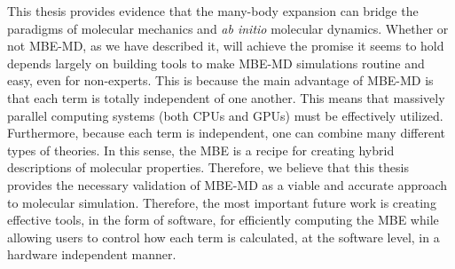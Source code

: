 \documentclass[11pt, proquest]{uwthesis}[2020/02/24]
\begin{document}
\par This thesis provides evidence that the many-body expansion can bridge the paradigms of molecular mechanics and \textit{ab initio} molecular dynamics. Whether or not MBE-MD, as we have described it, will achieve the promise it seems to hold depends largely on building tools to make MBE-MD simulations routine and easy, even for non-experts. This is because the main advantage of MBE-MD is that each term is totally independent of one another. This means that massively parallel computing systems (both CPUs and GPUs) must be effectively utilized. Furthermore, because each term is independent, one can combine many different types of theories. In this sense, the MBE is a recipe for creating hybrid descriptions of molecular properties. Therefore, we believe that this thesis provides the necessary validation of MBE-MD as a viable and accurate approach to molecular simulation. Therefore, the most important future work is creating effective tools, in the form of software, for efficiently computing the MBE while allowing users to control how each term is calculated, at the software level, in a hardware independent manner.

\printbibliography
\end{document}
